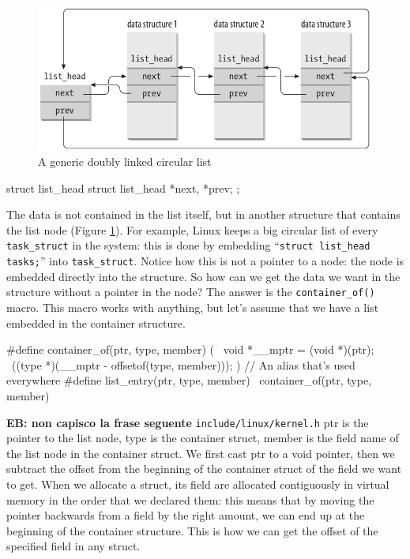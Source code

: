 \documentclass[10pt]{book}
\newcommand{\mycomment}[1]{\textbf{#1}}  %
\begin{document}
\begin{figure}[ht]
\includegraphics[width=\textwidth]{images/list.png}
\caption{A generic doubly linked circular list}
\label{img:list}
\end{figure}

\begin{code}
struct list_head {
	struct list_head *next, *prev;
};
\end{code}
The data is not contained in the list itself, but in another structure that contains the list node (Figure \ref{img:list}). For example, Linux keeps a big circular list of every \verb|task_struct| in the system: this is done by embedding ``\verb|struct list_head tasks;|'' into \verb|task_struct|. Notice how this is not a pointer to a node: the node is embedded directly into the structure. So how can we get the data we want in the structure without a pointer in the node? The answer is the \verb|container_of()| macro. This macro works with anything, but let's assume that we have a list embedded in the container structure.
\begin{code}
#define container_of(ptr, type, member) ({ \
	void *__mptr = (void *)(ptr); \
	((type *)(__mptr - offsetof(type, member))); })
// An alias that's used everywhere
#define list_entry(ptr, type, member) \
        container_of(ptr, type, member)
\end{code}
\mycomment{EB: non capisco la frase seguente}
\verb|include/linux/kernel.h|
ptr is the pointer to the list node, type is the container struct, member is the field name of the list node in the container struct. We first cast ptr to a void pointer, then we subtract the offset from the beginning of the container struct of the field we want to get. When we allocate a struct, its field are allocated contiguously in virtual memory in the order that we declared them: this means that by moving the pointer backwards from a field by the right amount, we can end up at the beginning of the container structure. This is how we can get the offset of the specified field in any struct. 
\end{document}
